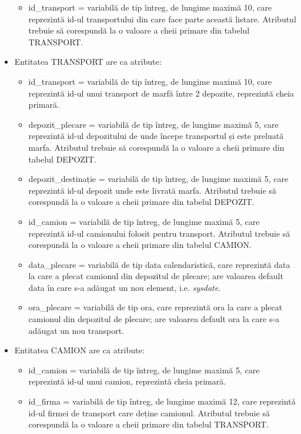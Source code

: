 \documentclass[12pt, a4paper]{article}
\begin{document}
\begin{itemize}
\begin{itemize}
            \item id\_transport = variabilă de tip întreg, de lungime maximă 10, care reprezintă id-ul transportului din care face parte această listare. Atributul trebuie să corespundă la o valoare a cheii primare din tabelul TRANSPORT.
        \end{itemize}
    \item Entitatea TRANSPORT are ca atribute:
        \begin{itemize}
            \item id\_transport = variabilă de tip întreg, de lungime maximă 10, care reprezintă id-ul unui transport de marfă între 2 depozite, reprezintă cheia primară.
            \item depozit\_plecare = variabilă de tip întreg, de lungime maximă 5, care reprezintă id-ul depozitului de unde începe transportul și este preluată marfa. Atributul trebuie să corespundă la o valoare a cheii primare din tabelul DEPOZIT.
            \item depozit\_destinație = variabilă de tip întreg, de lungime maximă 5, care reprezintă id-ul depozit unde este livrată marfa. Atributul trebuie să corespundă la o valoare a cheii primare din tabelul DEPOZIT.
            \item id\_camion = variabilă de tip întreg, de lungime maximă 5, care reprezintă id-ul camionului folosit pentru transport. Atributul trebuie să corespundă la o valoare a cheii primare din tabelul CAMION.
            \item data\_plecare = variabilă de tip data calendaristică, care reprezintă data la care a plecat camionul din depozitul de plecare; are valoarea default data în care s-a adăugat un nou element, i.e. \emph{sysdate}.
            \item ora\_plecare = variabilă de tip ora, care reprezintă ora la care a plecat camionul din depozitul de plecare; are valoarea default ora la care s-a adăugat un nou transport.
        \end{itemize}
    \item Entitatea CAMION are ca atribute:
        \begin{itemize}
            \item id\_camion = variabilă de tip întreg, de lungime maximă 5, care reprezintă id-ul unui camion, reprezintă cheia primară.
            \item id\_firma = variabilă de tip întreg, de lungime maximă 12, care reprezintă id-ul firmei de transport care deține camionul. Atributul trebuie să corespundă la o valoare a cheii primare din tabelul TRANSPORT.

\end{itemize}
\end{itemize}
\end{document}
